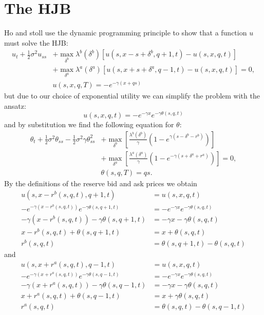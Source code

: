 \section{The HJB}
Ho and stoll use the dynamic programming principle to show that a function $u$ must solve the HJB:
\begin{align*}
    u_t + \frac{1}{2} \sigma^2u_{ss} &+ \max \limits_{ \delta^b } \lambda^b( \delta^b )[ u(s,x-s+\delta^b,q+1,t)-u(s,x,q,t)] \\
    &+\max\limits_{\delta^a}\lambda^a(\delta^a)[u(s,x+s+\delta^a,q-1,t)-u(s,x,q,t)]=0, \\
    & u(s,x,q,T) = -e^{-\gamma(x+qs)}
\end{align*}
but due to our choice of exponential utility we can simplify the problem with the ansatz:
$$u(s,x,q,t)=-e^{-\gamma x}e^{-\gamma\theta(s,q,t)}$$
and by substitution we find the following equation for $\theta:$
\begin{align*}
    \theta_t+\frac{1}{2}\sigma^2\theta_{ss}-\frac{1}{2}\sigma^2\gamma\theta_{ss}^2&+\max\limits_{\delta^b}\left[\frac{\lambda^b(\delta^b)}{\gamma}(1-e^{\gamma(s-\delta^b-r^b)})\right]\\
    &+\max\limits_{\delta^a}\left[\frac{\lambda^a(\delta^a)}{\gamma}(1-e^{-\gamma(s+\delta^a+r^a)})\right]=0,\\
    &\theta(s,q,T)=qs.
\end{align*}
By the definitions of the reserve bid and ask prices we obtain
\begin{align*}
    u(s,x-r^b(s,q,t),q+1,t)&=u(s,x,q,t)\\
    -e^{-\gamma(x-r^b(s,q,t))}e^{-\gamma\theta(s,q+1,t)}&=-e^{-\gamma x}e^{-\gamma\theta(s,q,t)}\\
    -\gamma(x-r^b(s,q,t))-\gamma\theta(s,q+1,t)&=-\gamma x-\gamma\theta(s,q,t)\\
    x-r^b(s,q,t)+\theta(s,q+1,t)&=x+\theta(s,q,t)\\
    r^b(s,q,t)&=\theta(s,q+1,t)-\theta(s,q,t)
\end{align*}
and
\begin{align*}
    u(s,x+r^a(s,q,t),q-1,t)&=u(s,x,q,t)\\
    -e^{-\gamma(x+r^a(s,q,t))}e^{-\gamma\theta(s,q-1,t)}&=-e^{-\gamma x}e^{-\gamma\theta(s,q,t)}\\
    -\gamma(x+r^a(s,q,t))-\gamma\theta(s,q-1,t)&=-\gamma x-\gamma\theta(s,q,t)\\
    x+r^a(s,q,t)+\theta(s,q-1,t)&=x+\gamma\theta(s,q,t)\\
    r^a(s,q,t)&=\theta(s,q,t)-\theta(s,q-1,t)
\end{align*}
